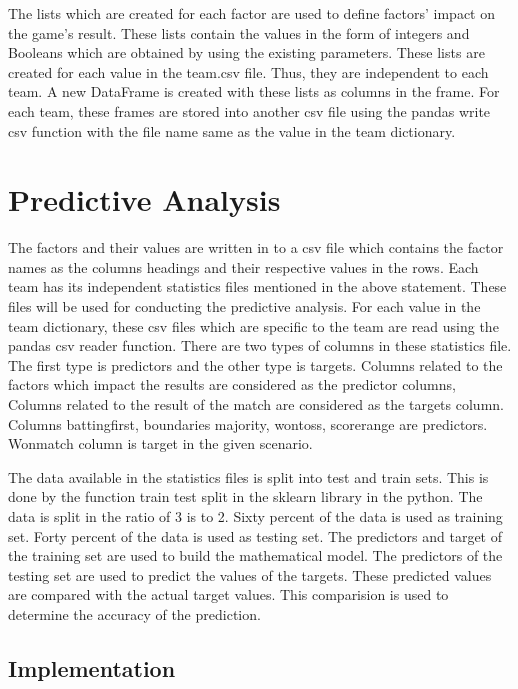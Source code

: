 \documentclass[sigconf]{acmart}
\begin{document}
The lists which are created for each factor are used to define factors’ impact on the game’s result. These lists contain the values in the form of integers and Booleans which are obtained by using the existing parameters. These lists are created for each value in the team.csv file. Thus, they are independent to each team. A new DataFrame is created with these lists as columns in the frame. For each team, these frames are stored into another csv file using the pandas write csv function with the file name same as the value in the team dictionary.

\section{Predictive Analysis}

The factors and their values are written in to a csv file which contains the factor names as the columns headings and their respective values in the rows. Each team has its independent statistics files mentioned in the above statement. These files will be used for conducting the predictive analysis. For each value in the team dictionary, these csv files which are specific to the team are read using the pandas csv reader function.  There are two types of columns in these statistics file. The first type is predictors and the other type is targets. Columns related to the factors which impact the results are considered as the predictor columns, Columns related to the result of the match are considered as the targets column. Columns battingfirst, boundaries majority, wontoss, scorerange are predictors. Wonmatch column is target in the given scenario. 

The data available in the statistics files is split into test and train sets. This is done by the function train test split in the sklearn library in the python. The data is split in the ratio of 3 is to 2. Sixty percent of the data is used as training set. Forty percent of the data is used as testing set. The predictors and target of the training set are used to build the mathematical model. The predictors of the testing set are used to predict the values of the targets. These predicted values are compared with the actual target values. This comparision is used to determine the accuracy of the prediction.

\subsection{Implementation}
\end{document}
